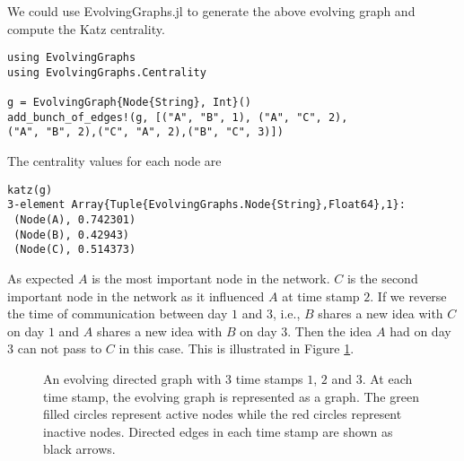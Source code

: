 \documentclass[12pt]{article}
\theoremstyle{definition}
\begin{document}
We could use EvolvingGraphs.jl to generate the above evolving graph and compute the Katz centrality.

\begin{lstlisting}
using EvolvingGraphs
using EvolvingGraphs.Centrality

g = EvolvingGraph{Node{String}, Int}()
add_bunch_of_edges!(g, [("A", "B", 1), ("A", "C", 2),
("A", "B", 2),("C", "A", 2),("B", "C", 3)])
\end{lstlisting}

The centrality values for each node are
\begin{lstlisting}
katz(g)
3-element Array{Tuple{EvolvingGraphs.Node{String},Float64},1}:
 (Node(A), 0.742301)
 (Node(B), 0.42943)
 (Node(C), 0.514373)
\end{lstlisting}

As expected $A$ is the most important node in the network. $C$ is the second important node in the network as it influenced
$A$ at time stamp $2$. If we reverse the time of communication between day $1$ and $3$, i.e., $B$ shares a new idea with $C$ on day $1$ and $A$ shares a new idea with $B$ on day $3$. Then the idea $A$ had on day $3$ can not pass to $C$ in this case. This is illustrated in Figure \ref{fig:katz_eg2}.

\begin{figure}[h]
 \begin{center}
\end{center}
\caption{An evolving directed graph with 3 time stamps $1$, $2$ and $3$.
At each time stamp, the evolving graph is represented as a graph.
The green filled circles represent active nodes while the red circles represent
inactive nodes. Directed edges in each time stamp are shown as black arrows.}
\label{fig:katz_eg2}
\end{figure}
\end{document}
